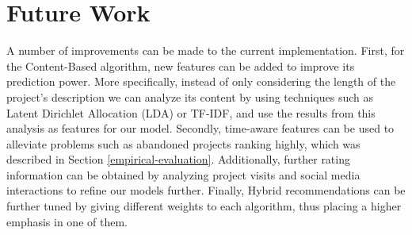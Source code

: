 \documentclass[cic,tc,english]{iiufrgs}
\begin{document}
\section{Future Work}
A number of improvements can be made to the current implementation. First, for the Content-Based algorithm, new features can be added to improve its prediction power. More specifically, instead of only considering the length of the project's description we can analyze its content by using techniques such as Latent Dirichlet Allocation (LDA) or TF-IDF, and use the results from this analysis as features for our model. Secondly, time-aware features can be used to alleviate problems such as abandoned projects ranking highly, which was described in Section \ref{empirical-evaluation}. Additionally, further rating information can be obtained by analyzing project visits and social media interactions to refine our models further. Finally, Hybrid recommendations can be further tuned by giving different weights to each algorithm, thus placing a higher emphasis in one of them.



\end{document}
